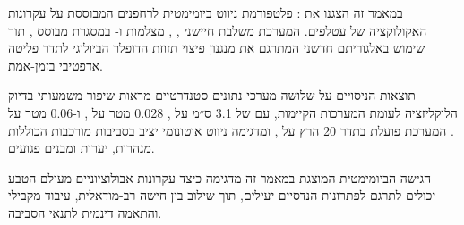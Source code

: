 במאמר זה הצגנו את : פלטפורמת ניווט ביומימטית
לרחפנים המבוססת על עקרונות האקולוקציה של עטלפים. המערכת משלבת
חיישני , , מצלמות ו- במסגרת
 מבוסס , תוך שימוש באלגוריתם
 חדשני המתרגם את מנגנון פיצוי תזוזת הדופלר הביולוגי
לתדר פליטה אדפטיבי בזמן-אמת.

תוצאות הניסויים על שלושה מערכי נתונים סטנדרטיים מראות שיפור
משמעותי בדיוק הלוקליזציה לעומת המערכות הקיימות, עם 
של 3.1 ס״מ על , 0.028 מטר על ,
ו-0.06 מטר על . המערכת פועלת בתדר 20 הרץ על
, ומדגימה ניווט אוטונומי יציב
בסביבות מורכבות הכוללות מנהרות, יערות ומבנים פגועים.

הגישה הביומימטית המוצגת במאמר זה מדגימה כיצד עקרונות אבולוציוניים
מעולם הטבע יכולים לתרגם לפתרונות הנדסיים יעילים, תוך שילוב
בין חישה רב-מודאלית, עיבוד מקבילי והתאמה דינמית לתנאי הסביבה.
\cite{AnthropicClaude}